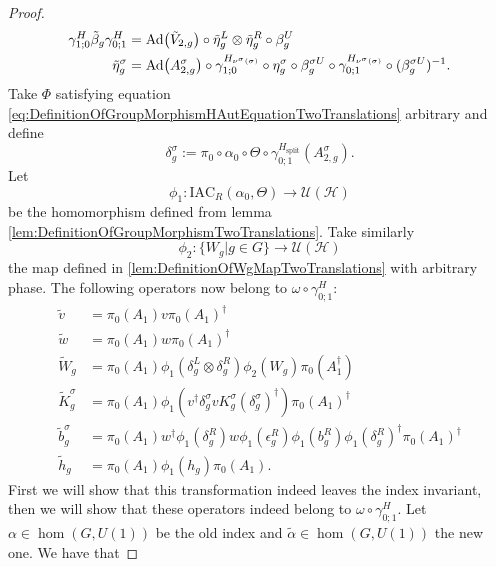 \documentclass[12pt,a4paper,twoside]{article}
\newcommand{\IAC}{\textrm{IAC}}
\let\originalleft\left
\let\originalright\right
\renewcommand{\left}{\mathopen{}\mathclose\bgroup\originalleft}
\renewcommand{\right}{\aftergroup\egroup\originalright}
\newcommand{\UU}{\mathcal U}
\newcommand{\HH}{\mathcal H}
\newcommand{\Ad}[1]{\textrm{Ad}\left(#1\right)}
\theoremstyle{definition}
\numberwithin{equation}{section}
\begin{document}
\begin{proof}
	\begin{align}
		\label{eq:IndexInvariantUnderLGAEtaTildeDefiniton1TwoTrans}
		\gamma^{H}_{1;0}\tilde{\beta}_g\gamma^{H}_{0;1}&=\Ad{\tilde V_{2,g}}\circ\tilde{\eta}_g^L\otimes\tilde{\eta}_g^R\circ\beta_g^U\\
		\label{eq:IndexInvariantUnderLGAEtaTildeDefiniton2TwoTrans}
		\tilde{\eta}_g^\sigma&=\Ad{A_{2,g}^\sigma}\circ\gamma^{H_{\nu^{\sigma}(\sigma)}}_{1;0}\circ\eta_g^\sigma\circ\beta_g^{\sigma U}\circ\gamma^{H_{\nu^{\sigma}(\sigma)}}_{0;1}\circ(\beta_g^{\sigma U})^{-1}.
	\end{align}
	Take $\Phi$ satisfying equation \ref{eq:DefinitionOfGroupMorphismHAutEquationTwoTranslations} arbitrary and define 
	\begin{equation}
		\delta_g^\sigma:=\pi_0\circ\alpha_0\circ\Theta\circ\gamma^{H_{\text{split}}}_{0;1}(A_{2,g}^\sigma).
	\end{equation}
	Let
	\begin{equation}
		\phi_1:\IAC_R(\alpha_0,\Theta) \rightarrow \UU(\HH)
	\end{equation}
	be the homomorphism defined from lemma \ref{lem:DefinitionOfGroupMorphismTwoTranslations}. Take similarly
	\begin{equation}
		\phi_2:\{W_g|g\in G\}\rightarrow \UU(\HH)
	\end{equation}
	the map defined in \ref{lem:DefinitionOfWgMapTwoTranslations} with arbitrary phase. The following operators now belong to $\omega\circ\gamma^{H}_{0;1}:$
	\begin{align}
		\tilde{v}&=\pi_0(A_1)v\pi_0(A_1)^\dagger\\
		\tilde{w}&=\pi_0(A_1)w\pi_0(A_1)^\dagger\\
		\tilde{W}_g&=\pi_0(A_1)\phi_1(\delta^L_g\otimes\delta^R_g)\phi_2( W_g)\pi_0(A_1^\dagger)\\
		\tilde{K}_g^\sigma&=\pi_0(A_1)\phi_1(v^\dagger \delta_g^\sigma v K_g^\sigma (\delta_g^\sigma)^\dagger) \pi_0(A_1)^\dagger\\
		\tilde{b}_g^\sigma&=\pi_0(A_1)w^\dagger \phi_1(\delta_g^R)w \phi_1(\epsilon_g^R)\phi_1(b_g^R)\phi_1(\delta_g^R)^\dagger\pi_0(A_1)^\dagger\\
		\tilde{h}_g&=\pi_0(A_1)\phi_1(h_g)\pi_0(A_1).
	\end{align}
	First we will show that this transformation indeed leaves the index invariant, then we will show that these operators indeed belong to $\omega\circ\gamma^H_{0;1}$. Let $\alpha\in\hom(G,U(1))$ be the old index and $\tilde{\alpha}\in\hom(G,U(1))$ the new one. We have that

\end{proof}
\end{document}
